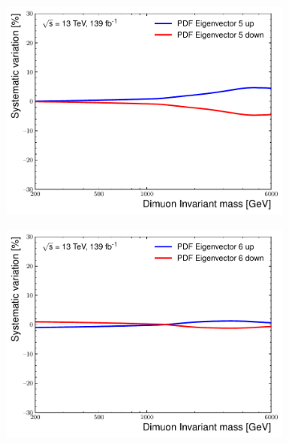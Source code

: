 \begin{figure}[h!]
\begin{subfigure}[b]{0.42\textwidth}
        \includegraphics[width=\textwidth]{figures/analysis/datamc/Uncertainties/theory/mm/backgroundTemplate_KF_PDF_EV5.pdf}
        \label{fig:uncert:mmpdfvar5}
    \end{subfigure}
    \begin{subfigure}[b]{0.42\textwidth}
        \centering
        \includegraphics[width=\textwidth]{figures/analysis/datamc/Uncertainties/theory/mm/backgroundTemplate_KF_PDF_EV6.pdf}
        \label{fig:uncert:mmpdfvar6}
    \end{subfigure}
    \begin{subfigure}[b]{0.42\textwidth}
        \centering

\end{subfigure}
\end{figure}
